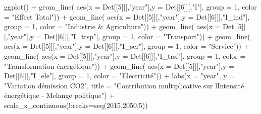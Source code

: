 \documentclass[
]{article}
\newenvironment{Shaded}{\begin{snugshade}}{\end{snugshade}}
\newcommand{\AttributeTok}[1]{\textcolor[rgb]{0.77,0.63,0.00}{#1}}
\newcommand{\DecValTok}[1]{\textcolor[rgb]{0.00,0.00,0.81}{#1}}
\newcommand{\FunctionTok}[1]{\textcolor[rgb]{0.00,0.00,0.00}{#1}}
\newcommand{\NormalTok}[1]{#1}
\newcommand{\SpecialCharTok}[1]{\textcolor[rgb]{0.00,0.00,0.00}{#1}}
\newcommand{\StringTok}[1]{\textcolor[rgb]{0.31,0.60,0.02}{#1}}
\begin{document}
\begin{Shaded}
\begin{Highlighting}[]
\FunctionTok{ggplot}\NormalTok{() }\SpecialCharTok{+} 
  \FunctionTok{geom\_line}\NormalTok{( }\FunctionTok{aes}\NormalTok{(}\AttributeTok{x =}\NormalTok{ Det[[}\DecValTok{5}\NormalTok{]][,}\StringTok{"year"}\NormalTok{],}\AttributeTok{y =}\NormalTok{ Det[[}\DecValTok{6}\NormalTok{]][,}\StringTok{"I"}\NormalTok{], }\AttributeTok{group =} \DecValTok{1}\NormalTok{, }\AttributeTok{color =} \StringTok{"Effect Total"}\NormalTok{)) }\SpecialCharTok{+} 
  \FunctionTok{geom\_line}\NormalTok{( }\FunctionTok{aes}\NormalTok{(}\AttributeTok{x =}\NormalTok{ Det[[}\DecValTok{5}\NormalTok{]][,}\StringTok{"year"}\NormalTok{],}\AttributeTok{y =}\NormalTok{ Det[[}\DecValTok{6}\NormalTok{]][,}\StringTok{"I\_ind"}\NormalTok{], }\AttributeTok{group =} \DecValTok{1}\NormalTok{, }\AttributeTok{color =} \StringTok{"Industrie \& Agriculture"}\NormalTok{)) }\SpecialCharTok{+} 
  \FunctionTok{geom\_line}\NormalTok{( }\FunctionTok{aes}\NormalTok{(}\AttributeTok{x =}\NormalTok{ Det[[}\DecValTok{5}\NormalTok{]][,}\StringTok{"year"}\NormalTok{],}\AttributeTok{y =}\NormalTok{ Det[[}\DecValTok{6}\NormalTok{]][,}\StringTok{"I\_trsp"}\NormalTok{], }\AttributeTok{group =} \DecValTok{1}\NormalTok{, }\AttributeTok{color =} \StringTok{"Transport"}\NormalTok{)) }\SpecialCharTok{+} 
  \FunctionTok{geom\_line}\NormalTok{( }\FunctionTok{aes}\NormalTok{(}\AttributeTok{x =}\NormalTok{ Det[[}\DecValTok{5}\NormalTok{]][,}\StringTok{"year"}\NormalTok{],}\AttributeTok{y =}\NormalTok{ Det[[}\DecValTok{6}\NormalTok{]][,}\StringTok{"I\_ser"}\NormalTok{], }\AttributeTok{group =} \DecValTok{1}\NormalTok{, }\AttributeTok{color =} \StringTok{"Service"}\NormalTok{)) }\SpecialCharTok{+} 
  \FunctionTok{geom\_line}\NormalTok{( }\FunctionTok{aes}\NormalTok{(}\AttributeTok{x =}\NormalTok{ Det[[}\DecValTok{5}\NormalTok{]][,}\StringTok{"year"}\NormalTok{],}\AttributeTok{y =}\NormalTok{ Det[[}\DecValTok{6}\NormalTok{]][,}\StringTok{"I\_trsf"}\NormalTok{], }\AttributeTok{group =} \DecValTok{1}\NormalTok{, }\AttributeTok{color =} \StringTok{"Transformation énergétique"}\NormalTok{)) }\SpecialCharTok{+} 
  \FunctionTok{geom\_line}\NormalTok{( }\FunctionTok{aes}\NormalTok{(}\AttributeTok{x =}\NormalTok{ Det[[}\DecValTok{5}\NormalTok{]][,}\StringTok{"year"}\NormalTok{],}\AttributeTok{y =}\NormalTok{ Det[[}\DecValTok{6}\NormalTok{]][,}\StringTok{"I\_ele"}\NormalTok{], }\AttributeTok{group =} \DecValTok{1}\NormalTok{, }\AttributeTok{color =} \StringTok{"Electricité"}\NormalTok{)) }\SpecialCharTok{+}
  \FunctionTok{labs}\NormalTok{(}\AttributeTok{x =} \StringTok{"year"}\NormalTok{, }\AttributeTok{y =} \StringTok{"Variation d\textquotesingle{}émission CO2"}\NormalTok{, }\AttributeTok{title =} \StringTok{"Contribution multiplicative sur l\textquotesingle{}Intensité énergétique {-} Melange politique"}\NormalTok{) }\SpecialCharTok{+} 
  \FunctionTok{scale\_x\_continuous}\NormalTok{(}\AttributeTok{breaks=}\FunctionTok{seq}\NormalTok{(}\DecValTok{2015}\NormalTok{,}\DecValTok{2050}\NormalTok{,}\DecValTok{5}\NormalTok{))}
\end{Highlighting}
\end{Shaded}
\end{document}

